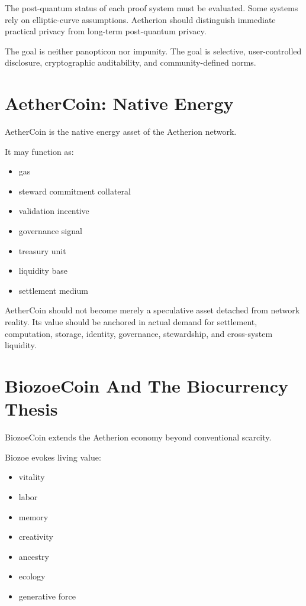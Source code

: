 ﻿\documentclass[12pt]{article}
\begin{document}
The post-quantum status of each proof system must be evaluated. Some systems rely on elliptic-curve assumptions. Aetherion should distinguish immediate practical privacy from long-term post-quantum privacy.

The goal is neither panopticon nor impunity. The goal is selective, user-controlled disclosure, cryptographic auditability, and community-defined norms.

\section{AetherCoin: Native Energy}


AetherCoin is the native energy asset of the Aetherion network.

It may function as:

\begin{itemize}
  \item gas
  \item steward commitment collateral
  \item validation incentive
  \item governance signal
  \item treasury unit
  \item liquidity base
  \item settlement medium
\end{itemize}

AetherCoin should not become merely a speculative asset detached from network reality. Its value should be anchored in actual demand for settlement, computation, storage, identity, governance, stewardship, and cross-system liquidity.

\section{BiozoeCoin And The Biocurrency Thesis}


BiozoeCoin extends the Aetherion economy beyond conventional scarcity.

Biozoe evokes living value:

\begin{itemize}
  \item vitality
  \item labor
  \item memory
  \item creativity
  \item ancestry
  \item ecology
  \item generative force
\end{itemize}
\end{document}
